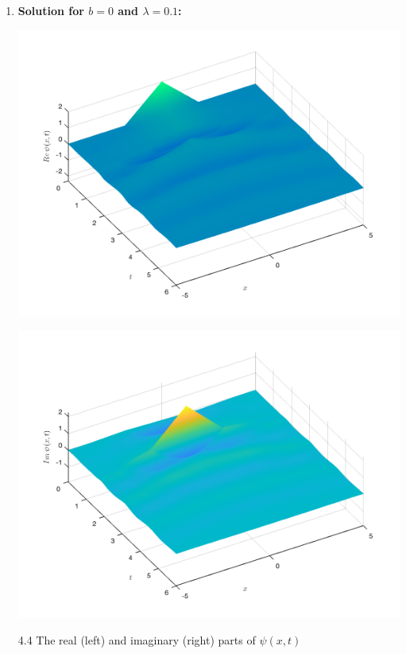 \documentclass[12pt, letterpaper, twoside]{article}
\begin{document}
\begin{enumerate}[label=(\alph*)]
\begin{enumerate}[label=(\roman*)]
        \item \textbf{Solution for $b=0$ and $\lambda=0.1$:}
    \begin{multicols}{2}
        \begin{center}
            \includegraphics[scale=0.35]{twisted modes/lamda01minus_real.png}
        \end{center}
        \begin{center}
            \includegraphics[scale=0.35]{twisted modes/lamda01minus_imag.png}
        \end{center}
    \end{multicols}
    \figurename{ 4.4 The real (left) and imaginary (right) parts of $\psi(x, t)$}
    \end{enumerate}
    
    
\end{enumerate}
\end{document}

